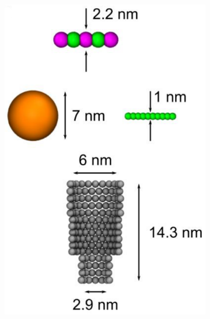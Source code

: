 \begin{figure}[ht]
  \begin{centering}
  \begin{subfigure}[t]{\dimexpr.4\linewidth-1.3em\relax}
  \centering
  \includegraphics[width=0.9\linewidth,valign=t]{Figures/Stefanos1.png}
  \end{subfigure}%
  \begin{subfigure}[t]{\dimexpr.5\linewidth-1.3em\relax}
  \centering

\end{subfigure}
\end{centering}
\end{figure}
